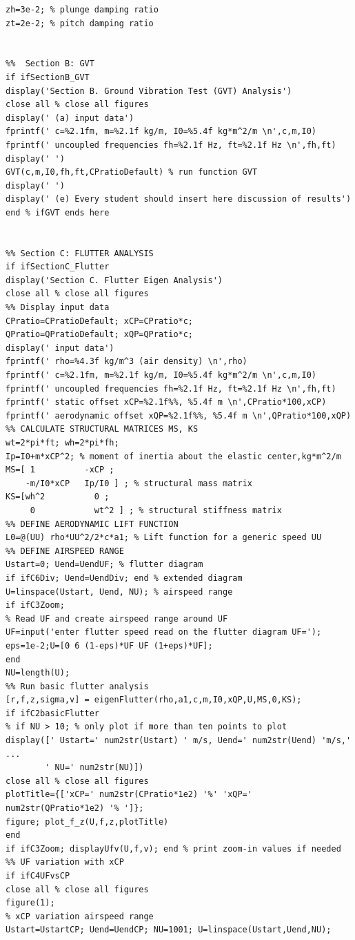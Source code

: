 \documentclass{article}
\begin{document}
\begin{lstlisting}[caption={Main analysis script for Homework 1.}, label={lst:main_script}]
% ------ data from homework D.2 ---------
zh=3e-2; % plunge damping ratio
zt=2e-2; % pitch damping ratio


%%  Section B: GVT
if ifSectionB_GVT
display('Section B. Ground Vibration Test (GVT) Analysis')
close all % close all figures
display(' (a) input data')
fprintf(' c=%2.1fm, m=%2.1f kg/m, I0=%5.4f kg*m^2/m \n',c,m,I0)
fprintf(' uncoupled frequencies fh=%2.1f Hz, ft=%2.1f Hz \n',fh,ft)
display(' ')
GVT(c,m,I0,fh,ft,CPratioDefault) % run function GVT
display(' ')
display(' (e) Every student should insert here discussion of results')
end % ifGVT ends here


%% Section C: FLUTTER ANALYSIS
if ifSectionC_Flutter
display('Section C. Flutter Eigen Analysis')
close all % close all figures
%% Display input data
CPratio=CPratioDefault; xCP=CPratio*c;
QPratio=QPratioDefault; xQP=QPratio*c;
display(' input data')
fprintf(' rho=%4.3f kg/m^3 (air density) \n',rho)
fprintf(' c=%2.1fm, m=%2.1f kg/m, I0=%5.4f kg*m^2/m \n',c,m,I0)
fprintf(' uncoupled frequencies fh=%2.1f Hz, ft=%2.1f Hz \n',fh,ft)
fprintf(' static offset xCP=%2.1f%%, %5.4f m \n',CPratio*100,xCP)
fprintf(' aerodynamic offset xQP=%2.1f%%, %5.4f m \n',QPratio*100,xQP)
%% CALCULATE STRUCTURAL MATRICES MS, KS
wt=2*pi*ft; wh=2*pi*fh;
Ip=I0+m*xCP^2; % moment of inertia about the elastic center,kg*m^2/m
MS=[ 1          -xCP ;
    -m/I0*xCP   Ip/I0 ] ; % structural mass matrix
KS=[wh^2          0 ;
     0            wt^2 ] ; % structural stiffness matrix
%% DEFINE AERODYNAMIC LIFT FUNCTION
L0=@(UU) rho*UU^2/2*c*a1; % Lift function for a generic speed UU
%% DEFINE AIRSPEED RANGE
Ustart=0; Uend=UendUF; % flutter diagram
if ifC6Div; Uend=UendDiv; end % extended diagram
U=linspace(Ustart, Uend, NU); % airspeed range
if ifC3Zoom;
% Read UF and create airspeed range around UF
UF=input('enter flutter speed read on the flutter diagram UF=');
eps=1e-2;U=[0 6 (1-eps)*UF UF (1+eps)*UF];
end
NU=length(U);
%% Run basic flutter analysis
[r,f,z,sigma,v] = eigenFlutter(rho,a1,c,m,I0,xQP,U,MS,0,KS);
if ifC2basicFlutter
% if NU > 10; % only plot if more than ten points to plot
display([' Ustart=' num2str(Ustart) ' m/s, Uend=' num2str(Uend) 'm/s,' ...
        ' NU=' num2str(NU)])
close all % close all figures
plotTitle={['xCP=' num2str(CPratio*1e2) '%' 'xQP=' num2str(QPratio*1e2) '% ']};
figure; plot_f_z(U,f,z,plotTitle)
end
if ifC3Zoom; displayUfv(U,f,v); end % print zoom-in values if needed
%% UF variation with xCP
if ifC4UFvsCP
close all % close all figures
figure(1);
% xCP variation airspeed range
Ustart=UstartCP; Uend=UendCP; NU=1001; U=linspace(Ustart,Uend,NU);

\end{lstlisting}
\end{document}
